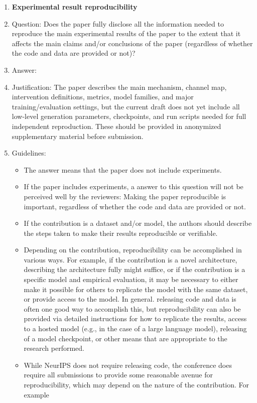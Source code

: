 \begin{enumerate}
    \item {\bf Experimental result reproducibility}
    \item[] Question: Does the paper fully disclose all the information needed to reproduce the main experimental results of the paper to the extent that it affects the main claims and/or conclusions of the paper (regardless of whether the code and data are provided or not)?
    \item[] Answer: \answerNo{}
    \item[] Justification: The paper describes the main mechanism, channel map, intervention definitions, metrics, model families, and major training/evaluation settings, but the current draft does not yet include all low-level generation parameters, checkpoints, and run scripts needed for full independent reproduction. These should be provided in anonymized supplementary material before submission.
    \item[] Guidelines:
    \begin{itemize}
        \item The answer \answerNA{} means that the paper does not include experiments.
        \item If the paper includes experiments, a \answerNo{} answer to this question will not be perceived well by the reviewers: Making the paper reproducible is important, regardless of whether the code and data are provided or not.
        \item If the contribution is a dataset and\slash or model, the authors should describe the steps taken to make their results reproducible or verifiable. 
        \item Depending on the contribution, reproducibility can be accomplished in various ways. For example, if the contribution is a novel architecture, describing the architecture fully might suffice, or if the contribution is a specific model and empirical evaluation, it may be necessary to either make it possible for others to replicate the model with the same dataset, or provide access to the model. In general. releasing code and data is often one good way to accomplish this, but reproducibility can also be provided via detailed instructions for how to replicate the results, access to a hosted model (e.g., in the case of a large language model), releasing of a model checkpoint, or other means that are appropriate to the research performed.
        \item While NeurIPS does not require releasing code, the conference does require all submissions to provide some reasonable avenue for reproducibility, which may depend on the nature of the contribution. For example

\end{itemize}
\end{enumerate}
